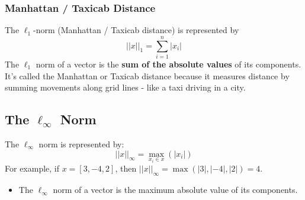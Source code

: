 \documentclass[10pt]{article}
\begin{document}
\subsubsection*{Manhattan / Taxicab Distance}
The $\ell_1$-norm (Manhattan / Taxicab distance) is represented by 
\[||x||_1 = \sum_{i = 1}^n |x_i|\]
The $\ell_1$ norm of a vector is the \textbf{sum of the absolute values} of its components.  It's called the Manhattan or Taxicab distance because it measures distance by summing movements along grid lines - like a taxi driving in a city.

\subsection*{The $\ell_\infty$ Norm}
The $\ell_\infty$ norm is represented by:
\[||x||_\infty = \max_{x_i \in x}(|x_i|)\]
For example, if $x= [3, -4, 2]$, then $||x||_\infty = \max(|3|, |-4|, |2|) = 4$.
\begin{itemize}
	\item The $\ell_\infty$ norm of a vector is the maximum absolute value of its components.
\end{itemize}
\end{document}
